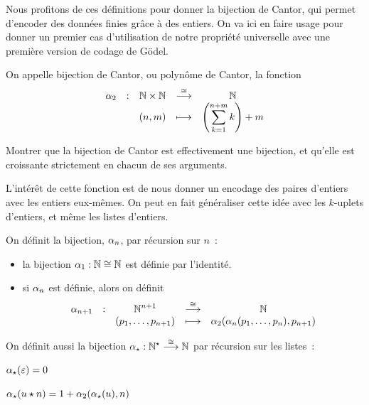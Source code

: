 Nous profitons de ces définitions pour donner la bijection de Cantor, qui
permet d'encoder des données finies grâce à des entiers. On va ici en faire
usage pour donner un premier cas d'utilisation de notre propriété universelle
avec une première version de codage de Gödel.

\begin{definition}\label{def.bij.Cantor}
  On appelle bijection de Cantor, ou polynôme de Cantor, la fonction
  \[\makeFunIso{\BijCB}{\bN\times\bN}{\bN}
               {(n,m)}{\displaystyle\left(\sum_{k = 1}^{n+m} k\right)+m}\]
\end{definition}

\begin{exercise}
  Montrer que la bijection de Cantor est effectivement une bijection, et qu'elle
  est croissante strictement en chacun de ses arguments.
\end{exercise}

L'intérêt de cette fonction est de nous donner un encodage des paires d'entiers
avec les entiers eux-mêmes. On peut en fait généraliser cette idée avec les
$k$-uplets d'entiers, et même les listes d'entiers.

\begin{definition}\label{def.bij.pairing}
  On définit la  bijection, $\alpha_{n}$, par
  récursion sur $n$~:
  \begin{itemize}
  \item la bijection $\alpha_{1} : \mathbb N \cong \mathbb N$ est définie par
    l'identité.
  \item si $\alpha_{n}$ est définie, alors on définit
    \[\makeFunIso{\BijCP{n+1}}{\bN^{n+1}}{\bN}
                 {(p_1,\ldots,p_{n+1})}{\BijCB(\BijCn(p_1,\ldots,p_n),p_{n+1})}\]
  \end{itemize}

  On définit aussi la bijection $\alpha_{\star} : \displaystyle \mathbb N^{\star} \overset{\cong}{\longrightarrow} \mathbb N$
  par récursion sur les listes~:
  \begin{itemize}
    \begin{minipage}{0.4\textwidth}
    \item $\alpha_{\star}(\varepsilon) = 0$
    \end{minipage}
    \begin{minipage}{0.5\textwidth}
    \item $\alpha_{\star}(u\mathbin{\star} n) = 1 + \alpha_{2}(\alpha_{\star}(u),n)$
    \end{minipage}
  \end{itemize}
\end{definition}

